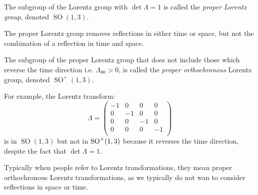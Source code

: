 \documentclass[../main.tex]{subfiles}
\begin{document}
\begin{definition}
  The subgroup of the Lorentz group with $\det \Lambda = 1$ is called the \textit{proper Lorentz group}, denoted $\operatorname{SO}(1, 3)$.
\end{definition}
The proper Lorentz group removes reflections in either time or space, but not the combination of a reflection in time and space.
\begin{definition}
  The subgroup of the proper Lorentz group that does not include those which reverse the time direction i.e. $\Lambda_{00} > 0$, is called the \textit{proper orthochronous} Lorentz group, denoted $\operatorname{SO}^{+}(1, 3)$. \label{properOrthochronous}
\end{definition}
\begin{example}
  For example, the Lorentz transform:
  \[
    \Lambda = \begin{pmatrix}
    -1 & 0 & 0 & 0 \\
    0 & -1 & 0 & 0 \\
    0 & 0 & -1 & 0 \\
    0 & 0 & 0 & -1 \\
    \end{pmatrix}
  \]
  is in $\operatorname{SO}(1, 3)$ but not in $\mathrm{SO}^{+}(1, 3)$ because it reverses the time direction, despite the fact that $\det \Lambda = 1$.
\end{example}
\begin{remark}[Nomenclature]
  Typically when people refer to Lorentz transformations, they mean proper orthochronous Lorentz transformations, as we typically do not wan to consider reflections in space or time.
\end{remark}
\end{document}
